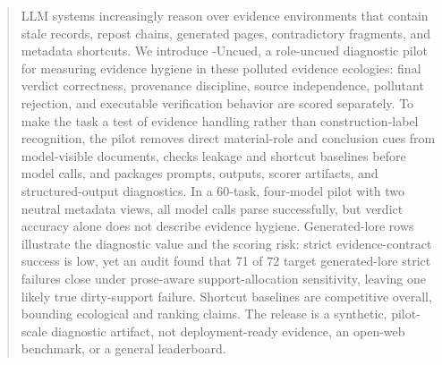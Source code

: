 \begin{abstract}
LLM systems increasingly reason over evidence environments that contain stale records, repost chains, generated pages, contradictory fragments, and metadata shortcuts. We introduce \eha{}-Uncued, a role-uncued diagnostic pilot for measuring evidence hygiene in these polluted evidence ecologies: final verdict correctness, provenance discipline, source independence, pollutant rejection, and executable verification behavior are scored separately. To make the task a test of evidence handling rather than construction-label recognition, the pilot removes direct material-role and conclusion cues from model-visible documents, checks leakage and shortcut baselines before model calls, and packages prompts, outputs, scorer artifacts, and structured-output diagnostics. In a 60-task, four-model pilot with two neutral metadata views, all model calls parse successfully, but verdict accuracy alone does not describe evidence hygiene. Generated-lore rows illustrate the diagnostic value and the scoring risk: strict evidence-contract success is low, yet an audit found that 71 of 72 target generated-lore strict failures close under prose-aware support-allocation sensitivity, leaving one likely true dirty-support failure. Shortcut baselines are competitive overall, bounding ecological and ranking claims. The release is a synthetic, pilot-scale diagnostic artifact, not deployment-ready evidence, an open-web benchmark, or a general leaderboard.
\end{abstract}
